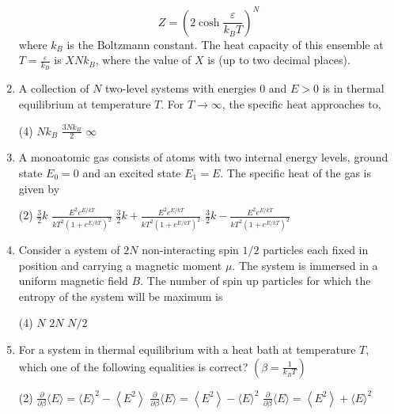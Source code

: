 \begin{enumerate}
	$$
	Z=\left(2 \cosh \frac{\varepsilon}{k_{B} T}\right)^{N}
	$$
	where $k_{B}$ is the Boltzmann constant. The heat capacity of this ensemble at $T=\frac{\varepsilon}{k_{B}}$ is $X N k_{B}$, where the value of $X$ is (up to two decimal places).
	{}
	\item A collection of $N$ two-level systems with energies 0 and $E>0$ is in thermal
	equilibrium at temperature $T$. For $T \rightarrow \infty$, the specific heat approaches to,
	{}
	\begin{tasks}(4)
		\task[\textbf{B.}] $N k_{B}$
		\task[\textbf{C.}] $\frac{3 N k_{B}}{2}$
		\task[\textbf{D.}] $\infty$
	\end{tasks}
	\item  A monoatomic gas consists of atoms with two internal energy levels, ground state $E_{0}=0$ and an excited state $E_{1}=E$. The specific heat of the gas is given by
	{}
	\begin{tasks}(2)
		\task[\textbf{A.}] $\frac{3}{2} k$
		\task[\textbf{B.}] $\frac{E^{2} e^{E / k T}}{k T^{2}\left(1+e^{E / k T}\right)^{2}}$
		\task[\textbf{C.}] $\frac{3}{2} k+\frac{E^{2} e^{E / k T}}{k T^{2}\left(1+e^{E / k T}\right)^{2}}$
		\task[\textbf{D.}] $\frac{3}{2} k-\frac{E^{2} e^{E / k T}}{k T^{2}\left(1+e^{E / k T}\right)^{2}}$
	\end{tasks}
	\item Consider a system of $2 N$ non-interacting spin $1 / 2$ particles each fixed in position and carrying a magnetic moment $\mu$. The system is immersed in a uniform magnetic field $B$. The number of spin up particles for which the entropy of the system will be maximum is
	{}
	\begin{tasks}(4)
		\task[\textbf{B.}] $N$
		\task[\textbf{C.}] $2 N$
		\task[\textbf{D.}] $N / 2$
	\end{tasks}
	\item For a system in thermal equilibrium with a heat bath at temperature $T$, which one of the following equalities is correct? $\left(\beta=\frac{1}{k_{B} T}\right)$
	{}
	\begin{tasks}(2)
		\task[\textbf{A.}] $\frac{\partial}{\partial \beta}\langle E\rangle=\langle E\rangle^{2}-\left\langle E^{2}\right\rangle$
		\task[\textbf{B.}] $\frac{\partial}{\partial \beta}\langle E\rangle=\left\langle E^{2}\right\rangle-\langle E\rangle^{2}$
		\task[\textbf{C.}] $\frac{\partial}{\partial \beta}\langle E\rangle=\left\langle E^{2}\right\rangle+\langle E\rangle^{2}$

\end{tasks}
\end{enumerate}
